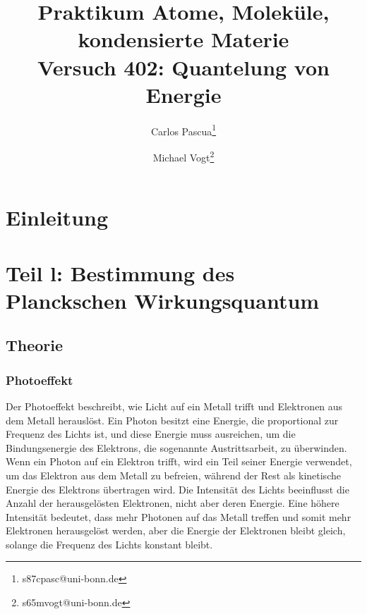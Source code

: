 \documentclass{article}
\title{Praktikum Atome, Moleküle, kondensierte Materie \\ Versuch 402: Quantelung von Energie}
\author[1]{Carlos Pascua\thanks{s87cpasc@uni-bonn.de}}
\author[1]{Michael Vogt\thanks{s65mvogt@uni-bonn.de}}
\affil[1]{Uni Bonn}
\begin{document}
\maketitle
\tableofcontents
\newpage
{}

\pagestyle{fancy}
\fancyhead[R]{\thepage}
\fancyhead[L]{\leftmark}

\section*{Einleitung}


\section{Teil l: Bestimmung des Planckschen Wirkungsquantum}
  \subsection{Theorie}

    \subsubsection{Photoeffekt}
    Der Photoeffekt beschreibt, wie Licht auf ein Metall trifft und Elektronen aus dem Metall
     herauslöst. Ein Photon besitzt eine Energie, die proportional zur Frequenz des Lichts ist, 
     und diese Energie muss ausreichen, um die Bindungsenergie des Elektrons, die sogenannte 
     Austrittsarbeit, zu überwinden. Wenn ein Photon auf ein Elektron trifft, wird ein Teil 
     seiner Energie verwendet, um das Elektron aus dem Metall zu befreien, während der Rest 
     als kinetische Energie des Elektrons übertragen wird. Die Intensität des
       Lichts beeinflusst die Anzahl der herausgelösten Elektronen, nicht aber deren Energie.
       Eine höhere Intensität bedeutet, dass mehr Photonen auf das Metall treffen und somit 
       mehr Elektronen herausgelöst werden, aber die Energie der Elektronen bleibt gleich, 
       solange die Frequenz des Lichts konstant bleibt.
       
\end{document}
